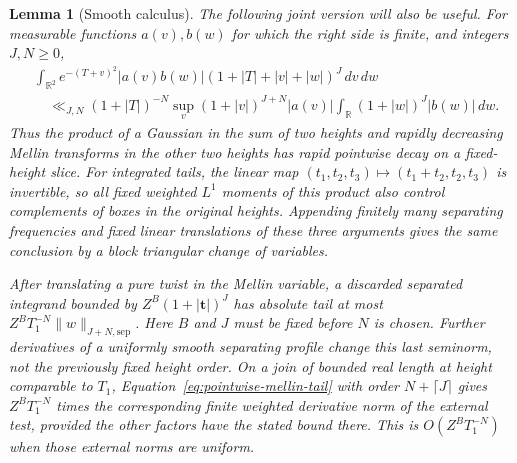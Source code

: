 \documentclass[11pt,a4paper]{article}
\numberwithin{equation}{section}
\numberwithin{figure}{section}
\newtheorem{lemma}[theorem]{Lemma}
\theoremstyle{definition}
\theoremstyle{remark}
\begin{document}
\begin{lemma}[Smooth calculus]
The following joint version will also be useful.  For measurable functions
$a(v),b(w)$ for which the right side is finite, and integers $J,N\ge0$,
\begin{equation}\label{eq:joint-gaussian-slice}
 \begin{split}
 &\int_{\mathbb R^2}e^{-(T+v)^2}|a(v)b(w)|
       (1+|T|+|v|+|w|)^J\,dv\,dw\\
 &\quad\ll_{J,N}(1+|T|)^{-N}
       \sup_v(1+|v|)^{J+N}|a(v)|
       \int_{\mathbb R}(1+|w|)^J|b(w)|\,dw.
 \end{split}
\end{equation}
Thus the product of a Gaussian in the sum of two heights and rapidly
decreasing Mellin transforms in the other two heights has rapid pointwise
decay on a fixed-height slice.  For integrated tails, the linear map
$(t_1,t_2,t_3)\mapsto(t_1+t_2,t_2,t_3)$ is invertible, so all fixed weighted
$L^1$ moments of this product also control complements of boxes in the
original heights.  Appending finitely many separating frequencies and fixed
linear translations of these three arguments gives the same conclusion by
a block triangular change of variables.

After translating a pure twist in the Mellin variable, a discarded
separated integrand bounded by $Z^B(1+|\boldsymbol t|)^J$ has absolute tail
at most
$Z^BT_1^{-N}\|w\|_{J+N,\mathrm{sep}}$.  Here $B$ and $J$ must be fixed
before $N$ is chosen.  Further derivatives of a uniformly smooth separating
profile change this last seminorm, not the previously fixed height order.
On a join of bounded real length at height comparable to $T_1$,
Equation~\eqref{eq:pointwise-mellin-tail} with order $N+\lceil J\rceil$
gives $Z^BT_1^{-N}$ times the corresponding finite weighted derivative
norm of the external test, provided the other factors have the stated bound
there.  This is $O(Z^BT_1^{-N})$ when those external norms are uniform.
\end{lemma}
\end{document}
